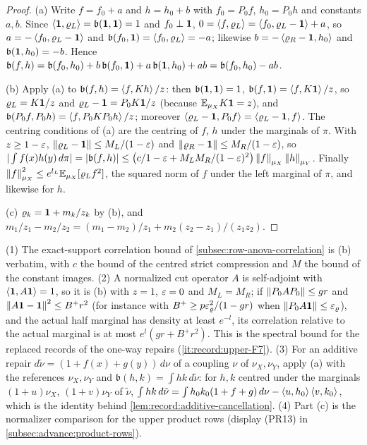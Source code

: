 \begin{proof}
(a) Write $f=f_0+a$ and $h=h_0+b$ with $f_0=P_0f$, $h_0=P_0h$ and constants
$a,b$. Since $\left\langle \mathbf 1,\varrho_L\right\rangle=\mathfrak b(\mathbf 1,\mathbf 1)=1$ and $f_0\perp\mathbf 1$,
$0=\left\langle f,\varrho_L\right\rangle=\left\langle f_0,\varrho_L-\mathbf 1\right\rangle+a$, so $a=-\left\langle f_0,\varrho_L-\mathbf 1\right\rangle$
and $\mathfrak b(f_0,\mathbf 1)=\left\langle f_0,\varrho_L\right\rangle=-a$; likewise
$b=-\left\langle \varrho_R-\mathbf 1,h_0\right\rangle$ and $\mathfrak b(\mathbf 1,h_0)=-b$. Hence
$\mathfrak b(f,h)=\mathfrak b(f_0,h_0)+b\,\mathfrak b(f_0,\mathbf 1)+a\,\mathfrak
b(\mathbf 1,h_0)+ab=\mathfrak b(f_0,h_0)-ab$.

(b) Apply (a) to $\mathfrak b(f,h)=\left\langle f,Kh\right\rangle/z$: then $\mathfrak b(\mathbf 1,\mathbf 1)=1$,
$\mathfrak b(f,\mathbf 1)=\left\langle f,K\mathbf 1\right\rangle/z$, so $\varrho_L=K\mathbf 1/z$ and
$\varrho_L-\mathbf 1=P_0K\mathbf 1/z$ (because $\mathbb E_{\mu_X}K\mathbf 1=z$), and $\mathfrak
b(P_0f,P_0h)=\left\langle f,P_0KP_0h\right\rangle/z$; moreover $\left\langle \varrho_L-\mathbf 1,P_0f\right\rangle=
\left\langle \varrho_L-\mathbf 1,f\right\rangle$. The centring conditions of (a) are the centring of $f$,
$h$ under the marginals of $\pi$. With $z\ge1-\varepsilon$,
$\left\|\varrho_L-\mathbf 1\right\|\le M_L/(1-\varepsilon)$ and $\left\|\varrho_R-\mathbf 1\right\|\le
M_R/(1-\varepsilon)$, so $|\int f(x)h(y)\,d\pi|=|\mathfrak b(f,h)|\le\big(c/1-\varepsilon+M_LM_R/(1-\varepsilon)^2\big)\left\|f\right\|_{\mu_X}\left\|h\right\|_{\mu_Y}$. Finally
$\left\|f\right\|^2_{\mu_X}\le e^{l_L}\mathbb E_{\mu_X}[\varrho_Lf^2]$, the squared norm of $f$
under the left marginal of $\pi$, and likewise for $h$.

(c) $\varrho_k=\mathbf 1+m_k/z_k$ by (b), and
$m_1/z_1-m_2/z_2=(m_1-m_2)/z_1+m_2(z_2-z_1)/(z_1z_2)$.
\end{proof}

\begin{remark}[Instances]\label{rem:recentering-uses}
(1) The exact-support correlation bound of
\cref{subsec:row-anova-correlation} is (b) verbatim, with $c$ the bound of the
centred strict compression and $M$ the bound of the constant images. (2) A
normalized cut operator $A$ is self-adjoint with $\left\langle \mathbf 1,A\mathbf 1\right\rangle=1$, so it is (b)
with $z=1$, $\varepsilon=0$ and $M_L=M_R$; if $\left\|P_0AP_0\right\|\le gr$ and
$\left\|A\mathbf 1-\mathbf 1\right\|^2\le B^+r^2$ (for instance with $B^+\ge p\varepsilon_\varrho^2/(1-gr)$
when $\left\|P_0A\mathbf 1\right\|\le\varepsilon_\varrho$), and the actual half marginal has density
at least $e^{-l}$, its correlation relative to the actual marginal is at most
$e^l(gr+B^+r^2)$. This is the spectral bound for the replaced records of the
one-way repairs (\ref{it:record:upper-F7}). (3) For an
additive repair $d\tilde\nu=(1+f(x)+g(y))\,d\nu$ of a coupling $\nu$ of
$\nu_X,\nu_Y$, apply (a) with the references $\nu_X,\nu_Y$ and $\mathfrak
b(h,k)=\int hk\,d\tilde\nu$: for $h,k$ centred under the marginals
$(1+u)\nu_X$, $(1+v)\nu_Y$ of $\tilde\nu$,
$\int hk\,d\tilde\nu=\int h_0k_0(1+f+g)\,d\nu-\left\langle u,h_0\right\rangle\left\langle v,k_0\right\rangle$, which is
the identity behind \cref{lem:record:additive-cancellation}. (4) Part (c) is
the normalizer comparison for the upper product rows (display
(PR13) in \cref{subsec:advance:product-rows}).
\end{remark}

